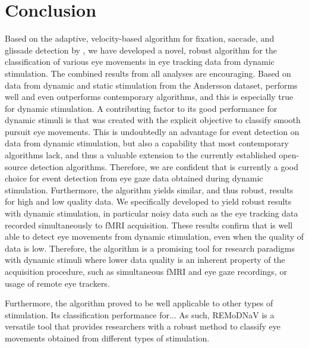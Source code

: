     \section*{Conclusion}\label{con}
    Based on the adaptive, velocity-based algorithm for fixation, saccade, and
    glissade detection by \cite{Nystrom2010AnData}, we have developed a novel,
    robust algorithm for the classification of various eye movements in eye tracking
    data from dynamic stimulation.
    The combined results from all analyses are encouraging. Based on data from dynamic and static stimulation from the
    Andersson dataset, \remodnav performs well and even outperforms contemporary algorithms, and this is especially true
    for dynamic stimulation. A contributing factor to its good performance for dynamic stimuli is that \remodnav was
    created with the explicit objective to classify smooth pursuit eye movements. This is undoubtedly an advantage for
    event detection on data from dynamic stimulation, but also a capability that most contemporary algorithms lack, and
    thus a valuable extension to the currently established open-source detection algorithms. Therefore, we are confident
    that \remodnav is currently a good choice for event detection from eye gaze data obtained during dynamic stimulation.
    Furthermore, the algorithm yields similar, and thus robust, results for high and low quality data. We specifically
    developed \remodnav to yield robust results with dynamic stimulation, in particular noisy data such as the eye
    tracking data recorded simultaneously to fMRI acquisition. These results confirm that \remodnav is well able to detect
    eye movements from dynamic stimulation, even when the quality of data is low. Therefore, the algorithm is a promising
    tool for research paradigms with dynamic stimuli where lower data quality is an inherent property of the acquisition
    procedure, such as simultaneous fMRI and eye gaze recordings, or usage of remote eye trackers.

    Furthermore, the algorithm proved to be well applicable to other types of stimulation. Its classification
    performance
    for... 
    As such, REMoDNaV is a versatile tool that provides researchers with a robust
    method to classify eye movements obtained from different types of stimulation.



